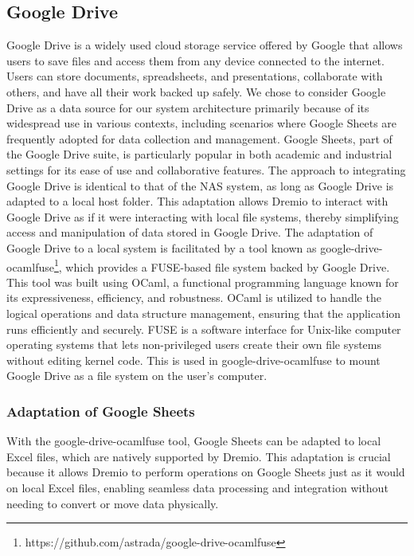 \subsection{Google Drive}
Google Drive is a widely used cloud storage service offered by Google that allows users to save files and access them from any device connected to the internet. Users can store documents, spreadsheets, and presentations, collaborate with others, and have all their work backed up safely.
We chose to consider Google Drive as a data source for our system architecture primarily because of its widespread use in various contexts, including scenarios where Google Sheets are frequently adopted for data collection and management. Google Sheets, part of the Google Drive suite, is particularly popular in both academic and industrial settings for its ease of use and collaborative features.
The approach to integrating Google Drive is identical to that of the \ac{NAS} system, as long as Google Drive is adapted to a local host folder. This adaptation allows Dremio to interact with Google Drive as if it were interacting with local file systems, thereby simplifying access and manipulation of data stored in Google Drive.
The adaptation of Google Drive to a local system is facilitated by a tool known as google-drive-ocamlfuse\footnote{https://github.com/astrada/google-drive-ocamlfuse}, which provides a FUSE-based file system backed by Google Drive. This tool was built using OCaml, a functional programming language known for its expressiveness, efficiency, and robustness. OCaml is utilized to handle the logical operations and data structure management, ensuring that the application runs efficiently and securely. \ac{FUSE} is a software interface for Unix-like computer operating systems that lets non-privileged users create their own file systems without editing kernel code. This is used in google-drive-ocamlfuse to mount Google Drive as a file system on the user's computer.
\subsubsection{Adaptation of Google Sheets}
With the google-drive-ocamlfuse tool, Google Sheets can be adapted to local Excel files, which are natively supported by Dremio. This adaptation is crucial because it allows Dremio to perform operations on Google Sheets just as it would on local Excel files, enabling seamless data processing and integration without needing to convert or move data physically.
